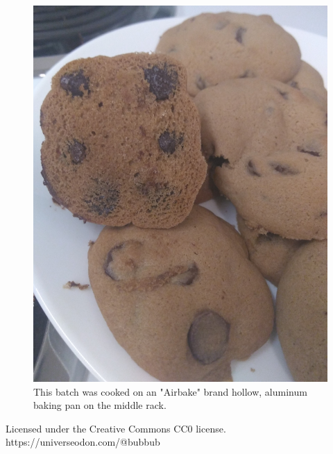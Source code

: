 \documentclass[12pt, letterpaper]{article}
\begin{document}
\begin{flushleft}


\begin{figure}[H]
\begin{center}
\includegraphics[width=0.6\linewidth]{./pics/cookies.jpg}
\caption{This batch was cooked on an "Airbake" brand hollow, aluminum baking pan on the middle rack.}
\end{center}
\end{figure}

Licensed under the Creative Commons CC0 license.
https://universeodon.com/@bubbub

\end{flushleft}
\end{document}
